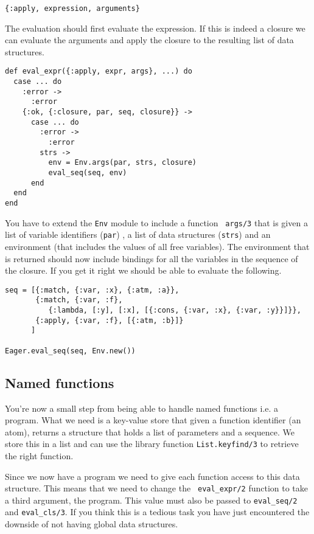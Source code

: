 \documentclass[a4paper,11pt]{article}
\begin{document}
\begin{verbatim}
{:apply, expression, arguments}
\end{verbatim}

The evaluation should first evaluate the expression. If this is indeed
a closure we can evaluate the arguments and apply the closure to the
resulting list of data structures.

\begin{verbatim}
def eval_expr({:apply, expr, args}, ...) do
  case ... do
    :error ->
      :error
    {:ok, {:closure, par, seq, closure}} ->
      case ... do
        :error ->
          :error
        strs ->
          env = Env.args(par, strs, closure)
          eval_seq(seq, env)
      end
  end
end
\end{verbatim}

You have to extend the {\tt Env} module to include a function {\tt
  args/3} that is given a list of variable identifiers ({\tt par}) , a
list of data structures ({\tt strs}) and an environment (that includes
the values of all free variables). The environment that is returned
should now include bindings for all the variables in the sequence of
the closure. If you get it right we should be able to evaluate the
following.

\begin{verbatim}
seq = [{:match, {:var, :x}, {:atm, :a}},
       {:match, {:var, :f}, 
          {:lambda, [:y], [:x], [{:cons, {:var, :x}, {:var, :y}}]}},
       {:apply, {:var, :f}, [{:atm, :b}]}
      ]
      
Eager.eval_seq(seq, Env.new())
\end{verbatim}

\subsection{Named functions}
You're now a small step from being able to handle named functions
i.e. a program. What we need is a key-value store that given a
function identifier (an atom), returns a structure that holds a list
of parameters and a sequence. We store this in a list and can use the
library function {\tt List.keyfind/3} to retrieve the right function.

Since we now have a program we need to give each function access to
this data structure. This means that we need to change the {\tt
  eval_expr/2} function to take a third argument, the program. This
value must also be passed to {\tt eval_seq/2} and {\tt eval_cls/3}. If
you think this is a tedious task you have just encountered the
downside of not having global data structures.
\end{document}
